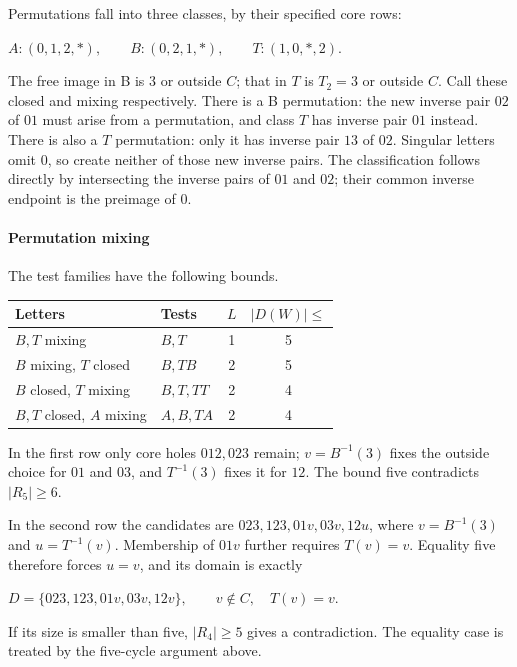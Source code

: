 \documentclass[11pt]{article}
\theoremstyle{definition}
\theoremstyle{plain}
\begin{document}
Permutations fall into three classes, by their specified core rows:

\(A:(0,1,2,*),\qquad B:(0,2,1,*),\qquad T:(1,0,*,2).\)

The free image in B is 3 or outside \(C\); that in \(T\) is \(T_{2}=3\)
or outside \(C\). Call these closed and mixing respectively. There is
a B permutation: the new inverse pair \(02\) of \(01\) must arise from a
permutation, and class \(T\) has inverse pair \(01\) instead. There is also
a \(T\) permutation: only it has inverse pair \(13\) of \(02\). Singular
letters omit 0, so create neither of those new inverse pairs. The
classification follows directly by intersecting the inverse pairs of \(01\)
and \(02\); their common inverse endpoint is the preimage of 0.

\paragraph{Permutation mixing}\label{permutation-mixing}

The test families have the following bounds.

\begin{center}
\begin{tabular}{llcc}
\toprule
Letters & Tests & $L$ & $|D(W)|\le$\\\midrule
$B,T$ mixing & $B,T$ & 1 & 5\\
$B$ mixing, $T$ closed & $B,TB$ & 2 & 5\\
$B$ closed, $T$ mixing & $B,T,TT$ & 2 & 4\\
$B,T$ closed, $A$ mixing & $A,B,TA$ & 2 & 4\\\bottomrule
\end{tabular}
\end{center}

In the first row only core holes \(012,023\) remain; \(v=B^{-1}(3)\) fixes the outside choice for \(01\) and
\(03\), and \(T^{-1}(3)\) fixes it for \(12\). The bound five contradicts
\(|R_{5}|\ge 6\).

In the second row the candidates are \(023,123,01v,03v,12u\), where \(v=B^{-1}(3)\) and \(u=T^{-1}(v)\). Membership of \(01v\) further requires \(T(v)=v\).
Equality five therefore forces \(u=v\), and its domain is exactly

\(D=\{023,123,01v,03v,12v\},\qquad v\notin C,\quad T(v)=v.\)

If its size is smaller than five, \(|R_{4}|\ge 5\) gives a
contradiction. The equality case is treated by the five-cycle argument above.
\end{document}
